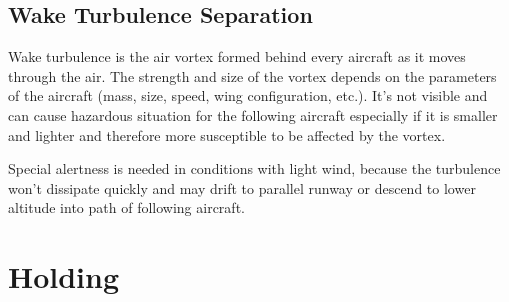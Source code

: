 

\subsection{Wake Turbulence Separation}

Wake turbulence is the air vortex formed behind every aircraft as it moves through the air. The strength and size of the vortex depends on the parameters of the aircraft (mass, size, speed, wing configuration, etc.). It's not visible and can cause hazardous situation for the following aircraft especially if it is smaller and lighter and therefore more susceptible to be affected by the vortex.

Special alertness is needed in conditions with light wind, because the turbulence won't dissipate quickly and may drift to parallel runway or descend to lower altitude into path of following aircraft.


\section{Holding}

